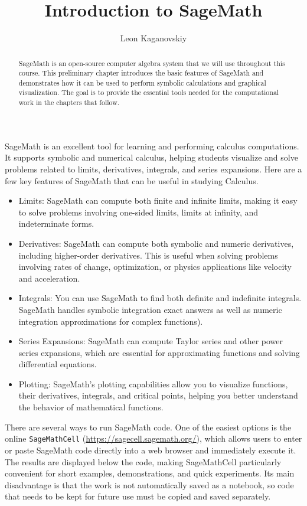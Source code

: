 \documentclass{ximera}
\author{Leon Kaganovskiy}
\title{Introduction to SageMath}
\begin{document}
\begin{abstract}
SageMath is an open-source computer algebra system that we will use throughout this course. This preliminary chapter introduces the basic features of SageMath and demonstrates how it can be used to perform symbolic calculations and graphical visualization. The goal is to provide the essential tools needed for the computational work in the chapters that follow.
\end{abstract}
\maketitle


SageMath is an excellent tool for learning and performing calculus computations. It supports symbolic and numerical calculus, helping students visualize and solve problems related to limits, derivatives, integrals, and series expansions. Here are a few key features of SageMath that can be useful in studying Calculus.  

\begin{itemize}
\item{Limits: SageMath can compute both finite and infinite limits, making it easy to solve problems involving one-sided limits, limits at infinity, and indeterminate forms.}
\item{Derivatives: SageMath can compute both symbolic and numeric derivatives, including higher-order derivatives. This is useful when solving problems involving rates of change, optimization, or physics applications like velocity and acceleration.}
\item{Integrals: You can use SageMath to find both definite and indefinite integrals. SageMath handles symbolic integration exact answers as well as numeric integration approximations for complex functions).}
\item{Series Expansions: SageMath can compute Taylor series and other power series expansions, which are essential for approximating functions and solving differential equations.}
\item{Plotting: SageMath’s plotting capabilities allow you to visualize functions, their derivatives, integrals, and critical points, helping you better understand the behavior of mathematical functions.}
\end{itemize}


There are several ways to run SageMath code. One of the easiest options is the online \texttt{SageMathCell} (\url{https://sagecell.sagemath.org/}), which allows users to enter or paste SageMath code directly into a web browser and immediately execute it. The results are displayed below the code, making SageMathCell particularly convenient for short examples, demonstrations, and quick experiments. Its main disadvantage is that the work is not automatically saved as a notebook, so code that needs to be kept for future use must be copied and saved separately.
\end{document}

